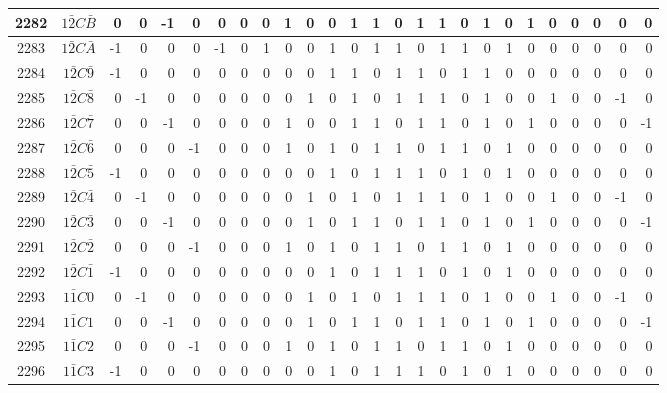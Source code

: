 \documentclass[12 pt]{article}%
\begin{document}
\begin{tiny}
\begin{centering}
\begin{longtable}{|c|c||rrrrrrrrrrrrrrrrrrrrrrrr|}
      \hline
      2282 & $1\bar2C\bar B$ & 0 & 0 & -1 & 0 & 0 & 0 & 0 & 1 & 0 & 0 & 1 & 1 & 0 & 1 & 1 & 0 & 1 & 0 & 1 & 0 & 0 & 0 & 0 & 0 \\
      \hline
      2283 & $1\bar2C\bar A$ & -1 & 0 & 0 & 0 & -1 & 0 & 1 & 0 & 0 & 1 & 0 & 1 & 1 & 0 & 1 & 1 & 0 & 1 & 0 & 0 & 0 & 0 & 0 & 0 \\
      \hline
      2284 & $1\bar2C\bar9$ & -1 & 0 & 0 & 0 & 0 & 0 & 0 & 0 & 0 & 1 & 1 & 0 & 1 & 1 & 0 & 1 & 1 & 0 & 0 & 0 & 0 & 0 & 0 & 0 \\
      \hline
      2285 & $1\bar2C\bar8$ & 0 & -1 & 0 & 0 & 0 & 0 & 0 & 0 & 1 & 0 & 1 & 0 & 1 & 1 & 1 & 0 & 1 & 0 & 0 & 1 & 0 & 0 & -1 & 0 \\
      \hline
      2286 & $1\bar2C\bar7$ & 0 & 0 & -1 & 0 & 0 & 0 & 0 & 1 & 0 & 0 & 1 & 1 & 0 & 1 & 1 & 0 & 1 & 0 & 1 & 0 & 0 & 0 & 0 & -1 \\
      \hline
      2287 & $1\bar2C\bar6$ & 0 & 0 & 0 & -1 & 0 & 0 & 0 & 1 & 0 & 1 & 0 & 1 & 1 & 0 & 1 & 1 & 0 & 1 & 0 & 0 & 0 & 0 & 0 & 0 \\
      \hline
      2288 & $1\bar2C\bar5$ & -1 & 0 & 0 & 0 & 0 & 0 & 0 & 0 & 0 & 1 & 0 & 1 & 1 & 1 & 0 & 1 & 0 & 1 & 0 & 0 & 0 & 0 & 0 & 0 \\
      \hline
      2289 & $1\bar2C\bar4$ & 0 & -1 & 0 & 0 & 0 & 0 & 0 & 0 & 1 & 0 & 1 & 0 & 1 & 1 & 1 & 0 & 1 & 0 & 0 & 1 & 0 & 0 & -1 & 0 \\
      \hline
      2290 & $1\bar2C\bar3$ & 0 & 0 & -1 & 0 & 0 & 0 & 0 & 0 & 1 & 0 & 1 & 1 & 0 & 1 & 1 & 0 & 1 & 0 & 1 & 0 & 0 & 0 & 0 & -1 \\
      \hline
      2291 & $1\bar2C\bar2$ & 0 & 0 & 0 & -1 & 0 & 0 & 0 & 1 & 0 & 1 & 0 & 1 & 1 & 0 & 1 & 1 & 0 & 1 & 0 & 0 & 0 & 0 & 0 & 0 \\
      \hline
      2292 & $1\bar2C\bar1$ & -1 & 0 & 0 & 0 & 0 & 0 & 0 & 0 & 0 & 1 & 0 & 1 & 1 & 1 & 0 & 1 & 0 & 1 & 0 & 0 & 0 & 0 & 0 & 0 \\
      \hline
      2293 & $1\bar1C0$ & 0 & -1 & 0 & 0 & 0 & 0 & 0 & 0 & 1 & 0 & 1 & 0 & 1 & 1 & 1 & 0 & 1 & 0 & 0 & 1 & 0 & 0 & -1 & 0 \\
      \hline
      2294 & $1\bar1C1$ & 0 & 0 & -1 & 0 & 0 & 0 & 0 & 0 & 1 & 0 & 1 & 1 & 0 & 1 & 1 & 0 & 1 & 0 & 1 & 0 & 0 & 0 & 0 & -1 \\
      \hline
      2295 & $1\bar1C2$ & 0 & 0 & 0 & -1 & 0 & 0 & 0 & 1 & 0 & 1 & 0 & 1 & 1 & 0 & 1 & 1 & 0 & 1 & 0 & 0 & 0 & 0 & 0 & 0 \\
      \hline
      2296 & $1\bar1C3$ & -1 & 0 & 0 & 0 & 0 & 0 & 0 & 0 & 0 & 1 & 0 & 1 & 1 & 1 & 0 & 1 & 0 & 1 & 0 & 0 & 0 & 0 & 0 & 0 \\

\end{longtable}
\end{centering}
\end{tiny}
\end{document}
